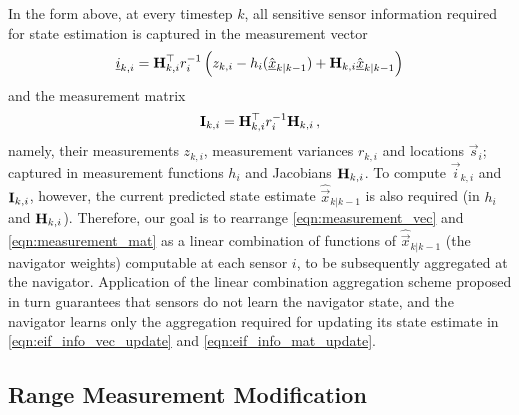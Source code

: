 \documentclass[10pt,letterpaper,oneside,twocolumn,journal]{IEEEtran}
\theoremstyle{definition}
\theoremstyle{definition}
\theoremstyle{remark}
\begin{document}
In the form above, at every timestep $k$, all sensitive sensor information required for state estimation is captured in the measurement vector
\begin{equation}
    \vec{i}_{k,i} = \mat{H}^\top_{k,i} r^{-1}_i \left(z_{k,i} - h_i(\hat{\vec{x}}_{k|k-1}) + \mat{H}_{k,i}\hat{\vec{x}}_{k|k-1}\right) \label{eqn:measurement_vec}
\end{equation}
and the measurement matrix
\begin{equation}
    \mat{I}_{k,i} = \mat{H}^\top_{k,i} r^{-1}_i \mat{H}_{k,i}\,, \label{eqn:measurement_mat}
\end{equation}
namely, their measurements $z_{k,i}$, measurement variances $r_{k,i}$ and locations $\vec{s}_i$; captured in measurement functions $h_i$ and Jacobians ${{\mathbf{H}}}_{k,i}$. To compute $\vec{i}_{k,i}$ and ${{\mathbf{I}}}_{k,i}$, however, the current predicted state estimate $\hat{\vec{x}}_{k|k-1}$ is also required (in $h_i$ and ${{\mathbf{H}}}_{k,i}$). Therefore, our goal is to rearrange \eqref{eqn:measurement_vec} and \eqref{eqn:measurement_mat} as a linear combination of functions of $\hat{\vec{x}}_{k|k-1}$ (the navigator weights) computable at each sensor $i$, to be subsequently aggregated at the navigator. Application of the linear combination aggregation scheme proposed in turn guarantees that sensors do not learn the navigator state, and the navigator learns only the aggregation required for updating its state estimate in \eqref{eqn:eif_info_vec_update} and \eqref{eqn:eif_info_mat_update}.

% 
% 

\subsection{Range Measurement Modification} \label{subsec:range_measurement_mod}
\end{document}
